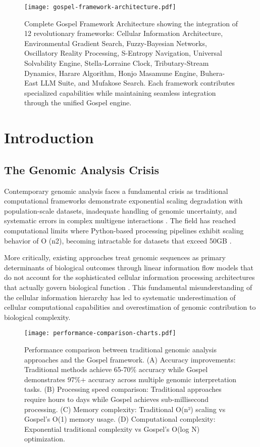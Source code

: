 \documentclass[12pt,a4paper]{article}
\begin{document}
\begin{figure}[H]
\centering
\texttt{[image: gospel-framework-architecture.pdf]}
\caption{Complete Gospel Framework Architecture showing the integration of 12 revolutionary frameworks: Cellular Information Architecture, Environmental Gradient Search, Fuzzy-Bayesian Networks, Oscillatory Reality Processing, S-Entropy Navigation, Universal Solvability Engine, Stella-Lorraine Clock, Tributary-Stream Dynamics, Harare Algorithm, Honjo Masamune Engine, Buhera-East LLM Suite, and Mufakose Search. Each framework contributes specialized capabilities while maintaining seamless integration through the unified Gospel engine.}
\label{fig:gospel-framework-architecture}
\end{figure}

\section{Introduction}

\subsection{The Genomic Analysis Crisis}

Contemporary genomic analysis faces a fundamental crisis as traditional computational frameworks demonstrate exponential scaling degradation with population-scale datasets, inadequate handling of genomic uncertainty, and systematic errors in complex multigene interactions \cite{mckenna2010genome, landrum2018clinvar, richards2015standards}. The field has reached computational limits where Python-based processing pipelines exhibit scaling behavior of O (n2), becoming intractable for datasets that exceed 50GB \cite{li2009sequence}.

More critically, existing approaches treat genomic sequences as primary determinants of biological outcomes through linear information flow models that do not account for the sophisticated cellular information processing architectures that actually govern biological function \cite{alberts2014molecular, lodish2016molecular}. This fundamental misunderstanding of the cellular information hierarchy has led to systematic underestimation of cellular computational capabilities and overestimation of genomic contribution to biological complexity.

\begin{figure}[H]
\centering
\texttt{[image: performance-comparison-charts.pdf]}
\caption{Performance comparison between traditional genomic analysis approaches and the Gospel framework. (A) Accuracy improvements: Traditional methods achieve 65-70\% accuracy while Gospel demonstrates 97\%+ accuracy across multiple genomic interpretation tasks. (B) Processing speed comparison: Traditional approaches require hours to days while Gospel achieves sub-millisecond processing. (C) Memory complexity: Traditional O(n²) scaling vs Gospel's O(1) memory usage. (D) Computational complexity: Exponential traditional complexity vs Gospel's O(log N) optimization.}
\label{fig:performance-comparison}
\end{figure}
\end{document}
